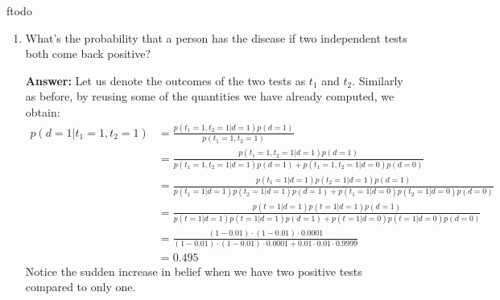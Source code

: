 ƒtodo\documentclass{article}
\newenvironment{QandA}{\begin{enumerate}[label=\arabic*.]}{\end{enumerate}}
\newenvironment{InnerQandA}{\begin{enumerate}[label=\roman*.]}{\end{enumerate}}
\newenvironment{answer}{\par\normalfont \textbf{Answer:}}{}
\newcommand{\g}{\vert}
\begin{document}
\begin{QandA}
\begin{InnerQandA}
        \item What’s the probability that a person has the disease if two independent tests both come back positive?
        \begin{answer}
            Let us denote the outcomes of the two tests as $t_1$ and $t_2$. Similarly as before, by reusing some of the quantities we have already computed, we obtain:
            \begin{align*}
                p(d = 1 \g t_1 = 1, t_2 = 1) 
                &= \frac{p(t_1 = 1, t_2 = 1 \g d=1) p(d=1)}{p(t_1 = 1, t_2 = 1)} \\
                &= \frac{p(t_1 = 1, t_2 = 1 \g d=1) p(d=1)}{p(t_1 = 1, t_2 = 1 \g d = 1)p(d=1)+ p(t_1 = 1, t_2 = 1 \g d = 0)p(d=0)} \\
                &= \frac{p(t_1 = 1 \g d=1) p(t_2 = 1 \g d=1) p(d=1)}{p(t_1 = 1 \g d=1) p(t_2 = 1 \g d=1) p(d=1) + p(t_1 = 1 \g d=0) p(t_2 = 1 \g d=0) p(d=0)} \\
                &= \frac{p(t = 1 \g d=1) p(t = 1 \g d=1) p(d=1)}{p(t = 1 \g d=1) p(t = 1 \g d=1) p(d=1) + p(t = 1 \g d=0) p(t = 1 \g d=0) p(d=0)} \\
                &= \frac{(1 - 0.01) \cdot (1-0.01) \cdot 0.0001}{(1 - 0.01) \cdot (1-0.01) \cdot 0.0001 + 0.01 \cdot 0.01 \cdot 0.9999} \\
                &= 0.495
            \end{align*}
        Notice the sudden increase in belief when we have two positive tests compared to only one.
        \end{answer}
    \end{InnerQandA}


\end{QandA}
\end{document}
